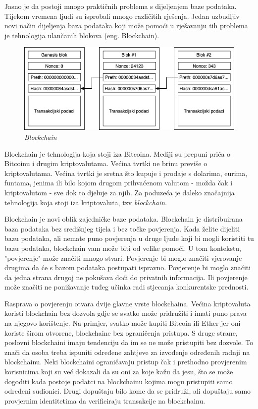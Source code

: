 \documentclass[times, utf8, diplomski]{fer}
\begin{document}
Jasno je da postoji mnogo praktičnih problema s dijeljenjem baze podataka. Tijekom vremena ljudi su isprobali mnogo različitih rješenja. Jedan uzbudljiv novi način dijeljenja baza podataka koji može pomoći u rješavanju tih problema je tehnologija ulančanih blokova (eng. Blockchain). 

\begin{figure}[htb]
\centering
\includegraphics[width=12cm]{imgs/Blockchain.png}
\caption{\textit{Blockchain}}
\label{fig:blockchain}
\end{figure}

Blockchain je tehnologija koja stoji iza Bitcoina. Mediji su prepuni priča o Bitcoinu i drugim kriptovalutama. Većina tvrtki ne brinu previše o kriptovalutama. Većina tvrtki je sretna što kupuje i prodaje s dolarima, eurima, funtama,  jenima ili bilo kojom drugom prihvaćenom valutom - možda čak i kriptovalutom - sve dok to djeluje za njih. Za poduzeća je daleko značajnija tehnologija koja stoji iza kriptovaluta, tzv \textit{\textit{blockchain}}.

Blockchain je novi oblik zajedničke baze podataka.  Blockchain je distribuirana baza podataka bez središnjeg tijela i bez točke povjerenja. Kada želite dijeliti bazu podataka, ali nemate puno povjerenja u druge ljude koji bi mogli koristiti tu bazu podataka, blockchain vam može biti od velike pomoći. U tom kontekstu, "povjerenje" može značiti mnogo stvari. Povjerenje bi moglo značiti vjerovanje drugima da će s bazom podataka postupati ispravno. Povjerenje bi moglo značiti da jedna strana drugoj ne pokušava doći do privatnih informacija. Ili povjerenje može značiti ne ponižavanje tuđeg učinka radi stjecanja konkurentske prednosti.

Rasprava o povjerenju otvara dvije glavne vrste blockchaina. Većina kriptovaluta koristi blockchain bez dozvola gdje se svatko može pridružiti i imati puno prava na njegovo korištenje. Na primjer, svatko može kupiti Bitcoin ili Ether jer oni koriste širom otvorene, blockchaine bez ograničenja pristupa. S druge strane, poslovni blockchaini imaju tendenciju da im se ne može pristupiti bez dozvole. To znači da osoba treba ispuniti određene zahtjeve za izvođenje određenih radnji na blockchainu. Neki blockchaini ograničavaju pristup čak i prethodno provjerenim korisnicima koji su već dokazali da su oni za koje kažu da jesu, što se može dogoditi kada postoje podatci na blockchainu kojima mogu pristupiti samo određeni sudionici. Drugi dopuštaju bilo kome da se pridruži, ali dopuštaju samo provjernim identitetima da verificiraju transakcije na blockchainu.
\end{document}
